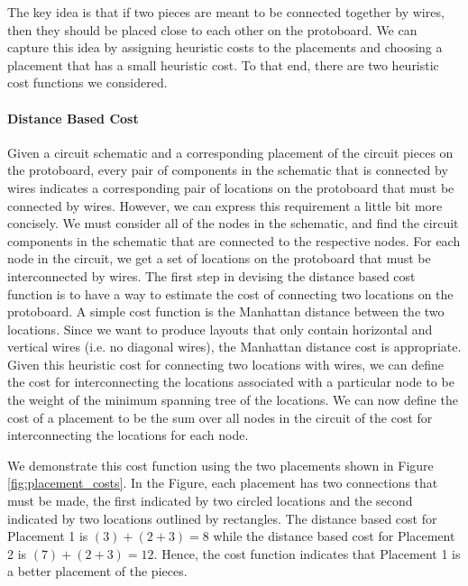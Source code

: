 The key idea is that if two pieces are meant to be connected together by wires,
then they should be placed close to each other on the protoboard. We can
capture this idea by assigning heuristic costs to the placements and choosing
a placement that has a small heuristic cost. To that end, there are two
heuristic cost functions we considered.

\paragraph{Distance Based Cost}
Given a circuit
schematic and a corresponding placement of the circuit pieces on the protoboard,
every pair of components in the schematic that is connected by wires indicates
a corresponding pair of
locations on the protoboard that must be connected by wires. However, we can
express this requirement a little bit more concisely. We must consider all
of the nodes in the schematic, and find the circuit components in the schematic
that are connected to the respective nodes. For each node in the circuit, we
get a set of locations on the protoboard that must be interconnected by wires.
The first step in devising the distance based cost function is to have a way to
estimate the cost of connecting two locations on the protoboard. A simple
cost function is the Manhattan distance between the two
locations. Since we want to produce layouts that only contain
horizontal and vertical wires (i.e. no diagonal wires), the Manhattan distance
cost is appropriate. Given this heuristic cost for connecting two locations with
wires, we can define the cost for interconnecting the locations
associated with a particular node to be the weight of the minimum spanning tree
of the locations. We can now define the cost of a placement to be the sum over
all nodes in the circuit of the cost for interconnecting the locations for each
node.

We demonstrate this cost function using the two placements shown in Figure
\ref{fig:placement_costs}. In the Figure, each placement has two connections
that must be made, the first indicated by two circled locations and the second
indicated by two locations outlined by rectangles. The distance based cost for
Placement 1 is $(3) + (2 + 3) = 8$ while the distance based cost for Placement 2
is $(7) + (2 + 3) = 12$. Hence, the cost function indicates that Placement 1
is a better placement of the pieces.

